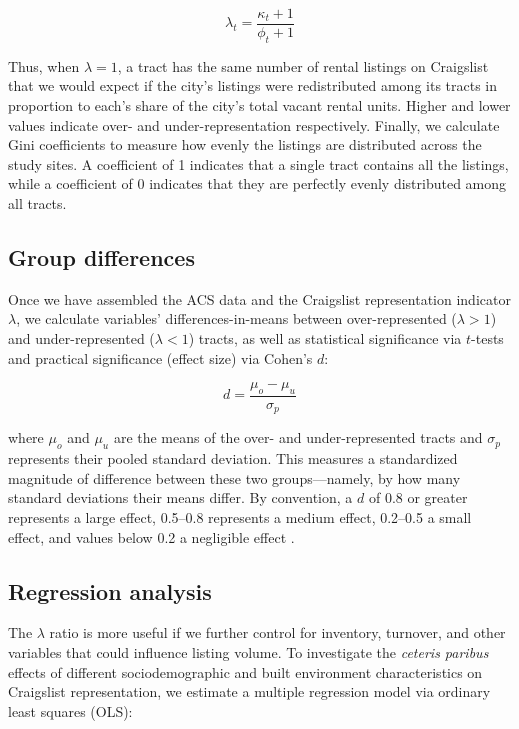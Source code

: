 \documentclass[11pt,letterpaper]{article}
\begin{document}
\begin{equation}
	\label{eq:representation}
	\lambda_t = \frac{\kappa_t + 1}{\phi_t + 1}
\end{equation}

Thus, when $\lambda=1$, a tract has the same number of rental listings on Craigslist that we would expect if the city's listings were redistributed among its tracts in proportion to each's share of the city's total vacant rental units. Higher and lower values indicate over- and under-representation respectively. Finally, we calculate Gini coefficients to measure how evenly the listings are distributed across the study sites. A coefficient of 1 indicates that a single tract contains all the listings, while a coefficient of 0 indicates that they are perfectly evenly distributed among all tracts.



\subsection{Group differences}

Once we have assembled the ACS data and the Craigslist representation indicator $\lambda$, we calculate variables' differences-in-means between over-represented ($\lambda>1$) and under-represented ($\lambda<1$) tracts, as well as statistical significance via $t$-tests and practical significance (effect size) via Cohen's $d$:

\begin{equation}
	\label{eq:cohen_d}
	d = \frac{\mu_o - \mu_u}{\sigma_p}
\end{equation}

where $\mu_o$ and $\mu_u$ are the means of the over- and under-represented tracts and $\sigma_p$ represents their pooled standard deviation. This measures a standardized magnitude of difference between these two groups---namely, by how many standard deviations their means differ. By convention, a $d$ of 0.8 or greater represents a large effect, 0.5--0.8 represents a medium effect, 0.2--0.5 a small effect, and values below 0.2 a negligible effect \citep{cohen_power_1992}.





\subsection{Regression analysis}

The $\lambda$ ratio is more useful if we further control for inventory, turnover, and other variables that could influence listing volume. To investigate the \textit{ceteris paribus} effects of different sociodemographic and built environment characteristics on Craigslist representation, we estimate a multiple regression model via ordinary least squares (OLS):
\end{document}
